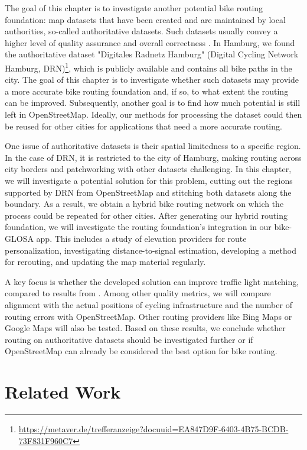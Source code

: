 The goal of this chapter is to investigate another potential bike routing foundation: map datasets that have been created and are maintained by local authorities, so-called authoritative datasets. Such datasets usually convey a higher level of quality assurance and overall correctness \cite{brovelli_towards_2017}. In Hamburg, we found the authoritative dataset "Digitales Radnetz Hamburg" (Digital Cycling Network Hamburg, DRN)\footnote{\url{https://metaver.de/trefferanzeige?docuuid=EA847D9F-6403-4B75-BCDB-73F831F960C7}}, which is publicly available and contains all bike paths in the city. The goal of this chapter is to investigate whether such datasets may provide a more accurate bike routing foundation and, if so, to what extent the routing can be improved. Subsequently, another goal is to find how much potential is still left in OpenStreetMap. Ideally, our methods for processing the dataset could then be reused for other cities for applications that need a more accurate routing.

One issue of authoritative datasets is their spatial limitedness to a specific region. In the case of DRN, it is restricted to the city of Hamburg, making routing across city borders and patchworking with other datasets challenging. In this chapter, we will investigate a potential solution for this problem, cutting out the regions supported by DRN from OpenStreetMap and stitching both datasets along the boundary. As a result, we obtain a hybrid bike routing network on which the process could be repeated for other cities. After generating our hybrid routing foundation, we will investigate the routing foundation's integration in our bike-GLOSA app. This includes a study of elevation providers for route personalization, investigating distance-to-signal estimation, developing a method for rerouting, and updating the map material regularly.

A key focus is whether the developed solution can improve traffic light matching, compared to results from . Among other quality metrics, we will compare alignment with the actual positions of cycling infrastructure and the number of routing errors with OpenStreetMap. Other routing providers like Bing Maps or Google Maps will also be tested. Based on these results, we conclude whether routing on authoritative datasets should be investigated further or if OpenStreetMap can already be considered the best option for bike routing.

\section{Related Work}

